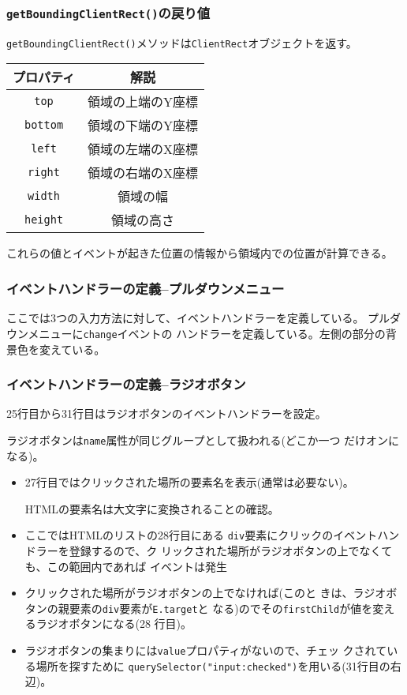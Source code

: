\begin{frame}[containsverbatim]
\frametitle{\texttt{getBoundingClientRect()}の戻り値}
 \texttt{getBoundingClientRect()}メソッドは\texttt{ClientRect}オブジェクトを返す。
\begin{center}
\begin{tabular}{|c|c|}\hline
プロパティ&\multicolumn{1}{c|}{解説} \\\hline
 \texttt{top}&領域の上端のY座標 \\\hline
 \texttt{bottom}&領域の下端のY座標 \\\hline
 \texttt{left}& 領域の左端のX座標\\\hline
 \texttt{right}& 領域の右端のX座標\\\hline
 \texttt{width}& 領域の幅\\\hline
 \texttt{height}& 領域の高さ\\\hline
\end{tabular}
\end{center}
これらの値とイベントが起きた位置の情報から領域内での位置が計算できる。
\end{frame}
\begin{frame}[containsverbatim]
\frametitle{イベントハンドラーの定義--プルダウンメニュー}
ここでは3つの入力方法に対して、イベントハンドラーを定義している。
 プルダウンメニューに\texttt{change}イベントの
       ハンドラーを定義している。左側の部分の背景色を変えている。
\end{frame}
\begin{frame}[containsverbatim]
 \frametitle{イベントハンドラーの定義--ラジオボタン}
 25行目から31行目はラジオボタンのイベントハンドラーを設定。

 ラジオボタンは\texttt{name}属性が同じグループとして扱われる(どこか一つ
 だけオンになる)。 
\end{frame}
\begin{frame}[containsverbatim]
\begin{itemize}
 \item 27行目ではクリックされた場所の要素名を表示(通常は必要ない)。
       
       HTMLの要素名は大文字に変換されることの確認。
 \item ここではHTMLのリストの28行目にある
       \texttt{div}要素にクリックのイベントハンドラーを登録するので、ク
       リックされた場所がラジオボタンの上でなくても、この範囲内であれば
       イベントは発生
 \item クリックされた場所がラジオボタンの上でなければ(このと
       きは、ラジオボタンの親要素の\texttt{div}要素が\texttt{E.target}と
       なる)のでその\texttt{firstChild}が値を変えるラジオボタンになる(28
       行目)。
 \item ラジオボタンの集まりには\texttt{value}プロパティがないので、チェッ
       クされている場所を探すために
       \texttt{querySelector("input:checked")}を用いる(31行目の右辺)。
\end{itemize}
\end{frame}
